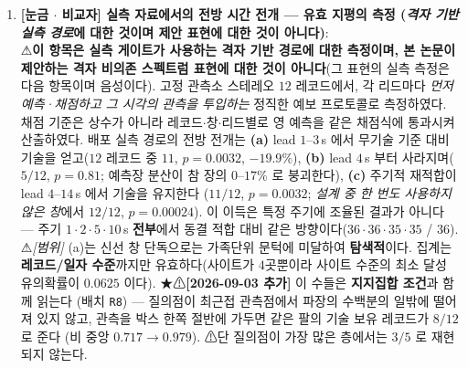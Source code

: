 \documentclass[11pt]{report}
\numberwithin{equation}{chapter}
\numberwithin{figure}{chapter}
\numberwithin{table}{chapter}
\begin{document}
\begin{enumerate}
  \item \textbf{[눈금 $\cdot$ 비교자] 실측 자료에서의 전방 시간 전개 --- 유효 지평의 측정
        (\emph{격자 기반 실측 경로}에 대한 것이며 제안 표현에 대한 것이 아니다)}: \\
        ⚠\textbf{이 항목은 실측 게이트가 사용하는 격자 기반 경로에 대한 측정이며,
        본 논문이 제안하는 격자 비의존 스펙트럼 표현에 대한 것이 아니다}(그 표현의 실측
        측정은 다음 항목이며 음성이다).
        고정 관측소 스테레오 $12$ 레코드에서, 각 리드마다 \emph{먼저 예측·채점하고 그 시각의
        관측을 투입하는} 정직한 예보 프로토콜로 측정하였다. 채점 기준은 상수가 아니라
        레코드$\cdot$창$\cdot$리드별로 영 예측을 같은 채점식에 통과시켜 산출하였다.
        배포 실측 경로의 전방 전개는 \textbf{(a)} lead $1$--$3$\,s 에서 무기술 기준 대비 기술을
        얻고($12$ 레코드 중 $11$, $p=0.0032$, $-19.9\%$), \textbf{(b)} lead $4$\,s 부터
        사라지며($5/12$, $p=0.81$; 예측장 분산이 참 장의 $0$--$17\%$ 로 붕괴한다),
        \textbf{(c)} 주기적 재적합이 lead $4$--$14$\,s 에서 기술을 유지한다
        ($11/12$, $p=0.0032$; \emph{설계 중 한 번도 사용하지 않은 창}에서 $12/12$, $p=0.00024$).
        이 이득은 특정 주기에 조율된 결과가 아니다 --- 주기 $1\cdot2\cdot5\cdot10$\,s
        \textbf{전부}에서 동결 적합 대비 같은 방향이다($36\cdot36\cdot35\cdot35$ / $36$).
        ⚠\emph{[범위]} (a)는 신선 창 단독으로는 가족단위 문턱에 미달하여 \textbf{탐색적}이다.
        집계는 \textbf{레코드/일자 수준}까지만 유효하다(사이트가 $4$곳뿐이라 사이트 수준의
        최소 달성 유의확률이 $0.0625$ 이다).
        ★⚠\textbf{[2026-09-03 추가]} 이 수들은 \textbf{지지집합 조건}과 함께 읽는다
        (배치 \texttt{R8}) --- 질의점이 최근접 관측점에서 파장의 수백분의 일밖에 떨어져 있지
        않고, 관측을 박스 한쪽 절반에 가두면 같은 팔의 기술 보유 레코드가 $8/12$ 로 준다
        (비 중앙 $0.717 \to 0.979$). ⚠단 질의점이 가장 많은 층에서는 $3/5$ 로 재현되지 않는다.


\end{enumerate}
\end{document}
